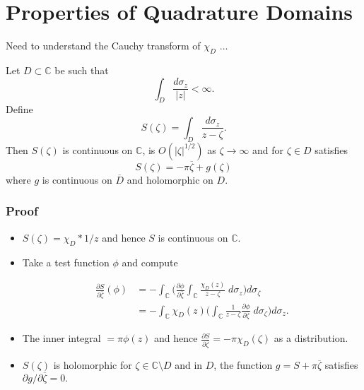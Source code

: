 \documentclass{beamer}
\begin{document}

\section{Properties of Quadrature Domains}

\begin{frame}

Need to understand the Cauchy transform of $\chi_D$ $\ldots$

\begin{lemma}
Let $D \subset \mathbb C$ be such that
\[
\int_{D} \frac{d \sigma_z}{\vert z \vert} < \infty.
\]
Define
\[
S(\zeta) = \int_D \frac{d \sigma_z}{z - \zeta}.
\]
Then $S(\zeta)$ is continuous on $\mathbb C$, is $O(\vert \zeta \vert^{1/2})$ as $\zeta \rightarrow \infty$ and for $\zeta \in D$ satisfies
\[
S(\zeta) = - \pi \overline \zeta + g(\zeta)
\]
where $g$ is continuous on $\overline D$ and holomorphic on $D$.
\end{lemma}

\end{frame}

\begin{frame}
 \frametitle{Proof}

 \begin{itemize}

 \item $S(\zeta) = \chi_D \ast 1/z$ and hence $S$ is continuous on $\mathbb C$.

 \item Take a test function $\phi$ and compute

\begin{align*}
\frac{\partial S}{\partial \overline \zeta} (\phi) &= - \int_{\mathbb C} \bigg( \frac{\partial \phi}{\partial \overline \zeta} \int_{\mathbb C} \frac{\chi_D(z)}{z - \zeta} \; d \sigma_z 
                                                                           \bigg) d \sigma_{\zeta}\\
                                                   &= - \int_{\mathbb C} \chi_D(z) \bigg( \int_{\mathbb C} \frac{1}{z - \zeta} \frac{\partial \phi}{\partial \overline \zeta} \; d 
                                                                            \sigma_{\zeta} \bigg) d \sigma_z.
\end{align*}

 \item The inner integral $ = \pi \phi(z)$ and hence $\frac{\partial S}{\partial \overline \zeta} = - \pi \chi_D(\zeta)$ as a distribution.

 \item $S(\zeta)$ is holomorphic for $\zeta \in \mathbb C \setminus D$ and in $D$, the function $g = S + \pi \overline \zeta$ satisfies 
${\partial g}/{\partial \overline \zeta} = 0.$


\end{itemize}

\end{frame}
\end{document}
